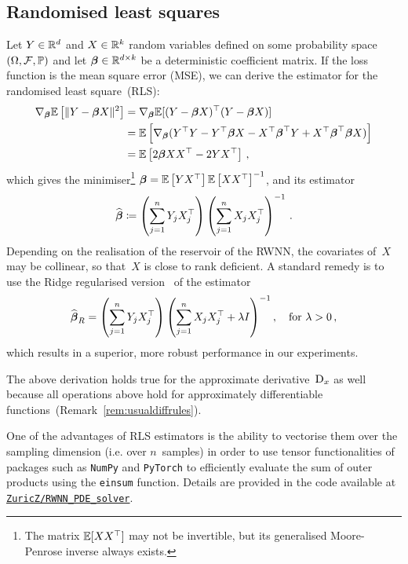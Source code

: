 \subsection{Randomised least squares}
\label{sec:randomizedLS}
Let $Y\in\mathbb{R}^d$ and $X\in\mathbb{R}^k$ random variables defined on some probability space $(\Omega, \mathcal{F}, \mathbb{P})$ and let $\boldsymbol{\beta}\in\mathbb{R}^{d\times k}$ be a deterministic coefficient matrix. 
If the loss function is the mean square error (MSE), we can derive the estimator for the randomised least square~(RLS):
\begin{align*}
    \nabla_{\boldsymbol{\beta}} \mathbb{E}\left[\|Y-\boldsymbol{\beta} X\|^2\right] &= \nabla_{\boldsymbol{\beta}} \mathbb{E}[(Y-\boldsymbol{\beta} X)^\top(Y-\boldsymbol{\beta} X)] \\ 
    &= \mathbb{E}\left[\nabla_{\boldsymbol{\beta}} (Y^\top Y - Y^\top \boldsymbol{\beta} X - X^\top\boldsymbol{\beta}^\top Y + X^\top\boldsymbol{\beta}^\top\boldsymbol{\beta} X)\right] \\
    &= \mathbb{E}\left[2\boldsymbol{\beta} XX^\top - 2YX^\top\right]\,,
\end{align*}
which gives the minimiser\footnote{The matrix $\mathbb{E}[XX^\top]$ may not be invertible, but its generalised Moore-Penrose inverse always exists.}
$\boldsymbol{\beta} = \mathbb{E}\left[YX^\top\right] \mathbb{E}\left[XX^\top\right]^{-1}$,
and its estimator
\[
\widehat{\boldsymbol{\beta}} \coloneqq  \left(\sum^n_{j=1} Y_j X_{j}^{\top}\right)\left(\sum^n_{j=1} X_jX_j^\top\right)^{-1}\,.
\]
Depending on the realisation of the reservoir of the RWNN, the covariates of~$X$ may be collinear, 
so that~$X$ is close to rank deficient. 
A standard remedy is to use the Ridge regularised version~\cite{Hoerl1970RidgeProblems} of the estimator
\[
\widehat{\boldsymbol{\beta}}_R = \left(\sum^n_{j=1} Y_j X_{j}^{\top}\right)\left(\sum^n_{j=1} X_jX_j^\top+\lambda I\right)^{-1},
\quad \text{for } \lambda>0\,,
\]
which results in a superior, more robust performance in our experiments.
\begin{remark}
The above derivation holds true for the approximate derivative~$\mathrm{D}_{x}$ as well because all operations above hold for approximately differentiable functions~(Remark~\ref{rem:usualdiffrules}).
\end{remark}
\begin{remark}
One of the advantages of RLS estimators is the ability to vectorise them over the sampling dimension (i.e. over $n$~samples) in order to use tensor functionalities of packages such as \textup{\texttt{NumPy}} and \textup{\texttt{PyTorch}} to efficiently evaluate the sum of outer products using the \textup{\texttt{einsum}} function. Details are provided in the code available at \href{https://github.com/ZuricZ/RWNN_PDE_solver}{\textup{\texttt{ZuricZ/RWNN\_PDE\_solver}}}.
\end{remark}

